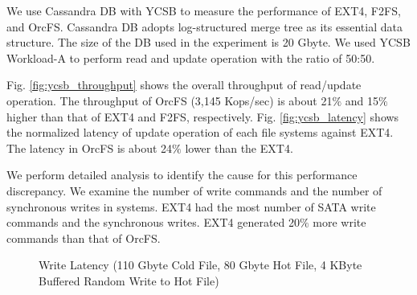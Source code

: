 \documentclass[pageno]{jpaper}
\begin{document}
We use Cassandra DB \cite{cassandraDB} with YCSB to measure the
performance of EXT4, F2FS, and OrcFS. Cassandra DB adopts
log-structured merge tree \cite{o1996log} as its essential data
structure.  The size of the DB used in the experiment is 20 Gbyte.  We
used YCSB Workload-A to perform read and update operation with the
ratio of 50:50.

Fig. \ref{fig:ycsb_throughput} shows the overall throughput of
read/update operation. The throughput of OrcFS (3,145 Kops/sec) is
about 21$\%$ and 15$\%$ higher than that of EXT4 and F2FS,
respectively. Fig. \ref{fig:ycsb_latency} shows the normalized latency
of update operation of each file systems against EXT4. The latency in
OrcFS is about 24$\%$ lower than the EXT4.

We perform detailed analysis to identify the cause for this
performance discrepancy.  We examine the number of write commands and
the number of synchronous writes in systems.  EXT4 had the most number
of SATA write commands and the synchronous writes. EXT4 generated
20$\%$ more write commands than that of OrcFS.



\begin{figure}[t]
  \centering
   \quad 
   \caption{Write Latency (110 Gbyte Cold File, 80 Gbyte Hot File, 4
     KByte Buffered Random Write to Hot File)\label{fig:lat_qpsc}}
\end{figure}
\end{document}
